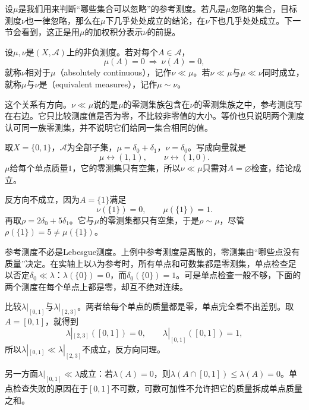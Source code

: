 设$\mu$是我们用来判断“哪些集合可以忽略”的参考测度。若凡是$\mu$忽略的集合，目标测度$\nu$也一律忽略，那么在$\mu$下几乎处处成立的结论，在$\nu$下也几乎处处成立。下一节会看到，这正是用$\mu$的加权积分表示$\nu$的前提。

\begin{definition}[测度的绝对连续与等价]
\label{def:dens-absolute-continuity}
设$\mu,\nu$是$(X,\mathcal A)$上的非负测度。若对每个$A\in\mathcal A$，
\begin{equation}
\mu(A)=0\ \Longrightarrow\ \nu(A)=0 ,
\label{eq:dens-ac-def}
\end{equation}
就称$\nu$相对于$\mu$（absolutely continuous），记作$\nu\ll\mu$。若$\nu\ll\mu$与$\mu\ll\nu$同时成立，就称$\mu$与$\nu$是（equivalent measures），记作$\mu\sim\nu$。
\end{definition}

这个关系有方向。$\nu\ll\mu$说的是$\mu$的零测集族包含在$\nu$的零测集族之中，参考测度写在右边。它只比较测度值是否为零，不比较非零值的大小。等价也只说明两个测度认可同一族零测集，并不说明它们给同一集合相同的值。

\begin{example}[两点空间上的单向关系]
\label{ex:dens-two-point}
取$X=\{0,1\}$，$\mathcal A$为全部子集，$\mu=\delta_0+\delta_1$，$\nu=\delta_0$。写成向量就是
\[
\mu\longleftrightarrow(1,1),\qquad\nu\longleftrightarrow(1,0).
\]
$\mu$给每个单点质量$1$，它的零测集只有空集，所以$\nu\ll\mu$只需对$A=\varnothing$检查，结论成立。

反方向不成立，因为$A=\{1\}$满足
\[
\nu(\{1\})=0,\qquad\mu(\{1\})=1.
\]
再取$\rho=2\delta_0+5\delta_1$。它与$\mu$的零测集都只有空集，于是$\rho\sim\mu$，尽管$\rho(\{1\})=5\neq\mu(\{1\})$。
\end{example}

参考测度不必是Lebesgue测度。上例中参考测度是离散的，零测集由“哪些点没有质量”决定。在实轴上以$\lambda$为参考时，所有单点和可数集都是零测集，单点检查足以否定$\delta_0\ll\lambda$：$\lambda(\{0\})=0$，而$\delta_0(\{0\})=1$。可是单点检查一般不够，下面的两个测度在每个单点上都是零，却互不绝对连续。

\begin{example}[区间上的连续质量]
\label{ex:dens-two-intervals}
比较$\lambda|_{[0,1]}$与$\lambda|_{[2,3]}$。两者给每个单点的质量都是零，单点完全看不出差别。取$A=[0,1]$，就得到
\[
\lambda|_{[2,3]}([0,1])=0,\qquad\lambda|_{[0,1]}([0,1])=1,
\]
所以$\lambda|_{[0,1]}\ll\lambda|_{[2,3]}$不成立，反方向同理。

另一方面$\lambda|_{[0,1]}\ll\lambda$成立：若$\lambda(A)=0$，则$\lambda(A\cap[0,1])\leq\lambda(A)=0$。单点检查失败的原因在于$[0,1]$不可数，可数可加性不允许把它的质量拆成单点质量之和。
\end{example}

